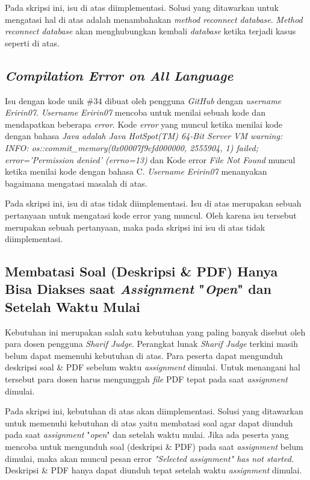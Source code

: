 Pada skripsi ini, isu di atas diimplementasi. Solusi yang ditawarkan untuk mengatasi hal di atas adalah menambahakan \textit{method reconnect database}. \textit{Method reconnect database} akan menghubungkan kembali \textit{database} ketika terjadi kasus seperti di atas.

\subsection{\textit{Compilation Error on All Language}}
Isu dengan kode unik \#34 dibuat oleh pengguna \textit{GitHub} dengan \textit{username} \textit{Eririn07}. \textit{Username} \textit{Eririn07} mencoba untuk menilai sebuah kode dan mendapatkan beberapa \textit{error}. Kode \textit{error} yang muncul ketika menilai kode dengan bahasa \textit{Java adalah Java HotSpot(TM) 64-Bit Server VM warning: INFO: os::commit\_memory(0x00007f9cfd000000, 2555904, 1) failed; error='Permission denied' (errno=13)} dan Kode error \textit{File Not Found} muncul ketika menilai kode dengan bahasa C. \textit{Username} \textit{Eririn07} menanyakan bagaimana mengatasi masalah di atas.

Pada skripsi ini, isu di atas tidak diimplementasi. Isu di atas merupakan sebuah pertanyaan untuk mengatasi kode error yang muncul. Oleh karena isu tersebut merupakan sebuah pertanyaan, maka pada skripsi ini isu di atas tidak diimplementasi.

\subsection{Membatasi Soal (Deskripsi \& PDF) Hanya Bisa Diakses saat \textit{Assignment} "\textit{Open}" dan Setelah Waktu Mulai}
\label{subsec:membatasisoal}
Kebutuhan ini merupakan salah satu kebutuhan yang paling banyak disebut oleh para dosen pengguna \textit{Sharif Judge}. Perangkat lunak \textit{Sharif Judge} terkini masih belum dapat memenuhi kebutuhan di atas. Para peserta dapat mengunduh deskripsi soal \& PDF sebelum waktu \textit{assignment} dimulai. Untuk menangani hal tersebut para dosen harus mengunggah \textit{file} PDF tepat pada saat \textit{assignment} dimulai. 

Pada skripsi ini, kebutuhan di atas akan diimplementasi. Solusi yang ditawarkan untuk memenuhi kebutuhan di atas yaitu membatasi soal agar dapat diunduh pada saat \textit{assignment} "\textit{open}" dan setelah waktu mulai. Jika ada peserta yang mencoba untuk mengunduh soal (deskripsi \& PDF) pada saat \textit{assignment} belum dimulai, maka akan muncul pesan error \textit{"Selected \textit{assignment"} has not started.} Deskripsi \& PDF hanya dapat diunduh tepat setelah waktu \textit{assignment} dimulai.

